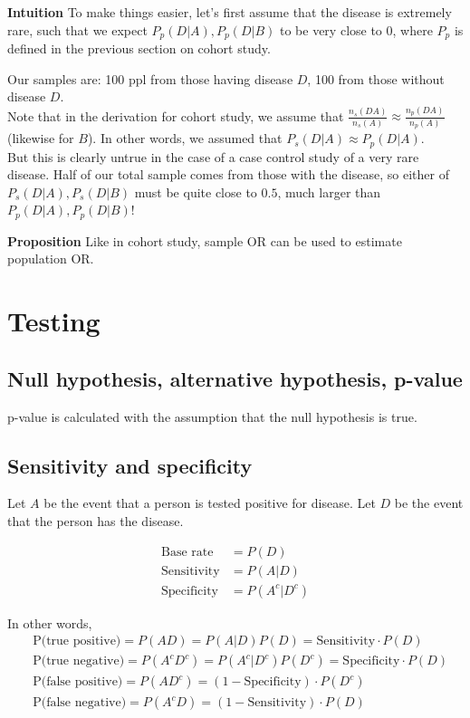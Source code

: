 \documentclass{article}
\begin{document}
\textbf{Intuition} To make things easier, let's first assume that the disease is extremely rare, such that we expect $P_p(D|A),P_p(D|B)$ to be very close to $0$, where $P_p$ is defined in the previous section on cohort study.

Our samples are: 100 ppl from those having disease $D$, 100 from those without disease $D$.\\
Note that in the derivation for cohort study, we assume that $\frac{n_s(DA)}{n_s(A)}\approx \frac{n_p(DA)}{n_p(A)}$ (likewise for $B$). In other words, we assumed that $P_s(D|A)\approx P_p(D|A)$.\\
But this is clearly untrue in the case of a case control study of a very rare disease. Half of our total sample comes from those with the disease, so either of $P_s(D|A),P_s(D|B)$ must be quite close to $0.5$, much larger than $P_p(D|A),P_p(D|B)$!

\textbf{Proposition} Like in cohort study, sample OR can be used to estimate population OR.


\section{Testing}
\subsection{Null hypothesis, alternative hypothesis, p-value}
p-value is calculated with the assumption that the null hypothesis is true.

\subsection{Sensitivity and specificity}
Let $A$ be the event that a person is tested positive for disease.
Let $D$ be the event that the person has the disease.

\begin{align*}
	\text{Base rate} &= P(D)\\
	\text{Sensitivity} &= P(A|D)\\
	\text{Specificity} &= P(A^c|D^c)
\end{align*}

In other words,\\
\begin{align*}
	&\text{P(true positive)} = P(AD) = P(A|D)P(D) = \text{Sensitivity}\cdot P(D)\\
	&\text{P(true negative)} = P(A^cD^c)=P(A^c|D^c)P(D^c)=\text{Specificity}\cdot P(D)\\
	&\text{P(false positive)} = P(AD^c) = (1-\text{Specificity})\cdot P(D^c)\\
	&\text{P(false negative)} = P(A^cD) = (1-\text{Sensitivity})\cdot P(D)\\
\end{align*}
\end{document}
